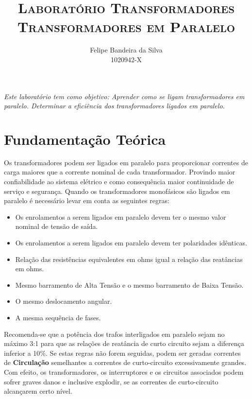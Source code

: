 \documentclass[paper=a4, fontsize=11pt]{article}
\title{\textsc{Laboratório Transformadores\\Transformadores em Paralelo}}
\author{Felipe Bandeira da Silva\\1020942-X}
\begin{document}
\maketitle


\textit{Este laboratório tem como objetivo: Aprender como se ligam transformadores
em paralelo. Determinar a eficiência dos transformadores ligados em paralelo.}

\newpage

\tableofcontents

\newpage



\newpage
\section{Fundamentação Teórica}

Os transformadores podem ser ligados em paralelo para proporcionar correntes de carga
maiores que a corrente nominal de cada transformador. Provindo maior confiabilidade
ao sistema elétrico e como consequência maior continuidade de serviço e segurança.
Quando os transformadores monofásicos são ligados em paralelo é necessário levar
em conta as seguintes regras:
\begin{itemize}
    \item Os enrolamentos a serem ligados em paralelo devem ter o mesmo valor nominal
        de tensão de saída.
    \item Os enrolamentos a serem ligados em paralelo devem ter polaridades idênticas.
    \item Relação das resistências equivalentes em ohms igual a relação das reatâncias
        em ohms.
    \item Mesmo barramento de Alta Tensão e o mesmo barramento de Baixa Tensão.
    \item O mesmo deslocamento angular.
    \item A mesma sequência de fases.
\end{itemize}
Recomenda-se que a potência dos trafos interligados em paralelo sejam no máximo 3:1 
para que as relações de reatância de curto circuito sejam a diferença inferior a 10$\%$.
Se estas regras não forem seguidas, podem ser geradas correntes de \textbf{Circulação}
semelhantes a correntes de curto-circuito excessivamente grandes. Com efeito, os 
transformadores, os interruptores e os circuitos associados podem sofrer graves danos
e inclusive explodir, se as correntes de curto-circuito alcançarem certo nível.
\end{document}

